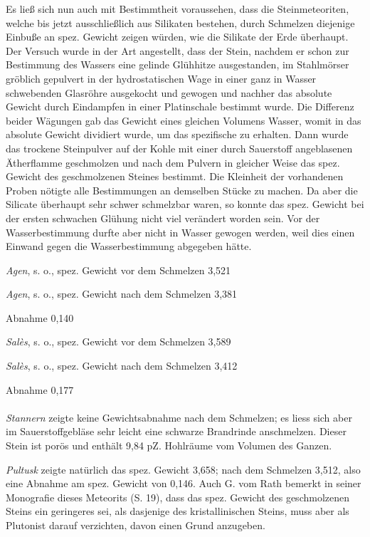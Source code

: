 \documentclass[a4paper, 11pt, oneside, german]{article}
\begin{document}
Es ließ sich nun auch mit Bestimmtheit voraussehen, dass die Steinmeteoriten, welche bis jetzt ausschließlich aus Silikaten bestehen, durch Schmelzen diejenige Einbuße an spez. Gewicht zeigen würden, wie die Silikate der Erde überhaupt. Der Versuch wurde in der Art angestellt, dass der Stein, nachdem er schon zur Bestimmung des Wassers eine gelinde Glühhitze ausgestanden, im Stahlmörser gröblich gepulvert in der hydrostatischen Wage in einer ganz in Wasser schwebenden Glasröhre ausgekocht und gewogen und nachher das absolute Gewicht durch Eindampfen in einer Platinschale bestimmt wurde. Die Differenz beider Wägungen gab das Gewicht eines gleichen Volumens Wasser, womit in das absolute Gewicht dividiert wurde, um das spezifische zu erhalten. Dann wurde das trockene Steinpulver auf der Kohle mit einer durch Sauerstoff angeblasenen Ätherflamme geschmolzen und nach dem Pulvern in gleicher Weise das spez. Gewicht des geschmolzenen Steines bestimmt. Die Kleinheit der vorhandenen Proben nötigte alle Bestimmungen an demselben Stücke zu machen. Da aber die Silicate überhaupt sehr schwer schmelzbar waren, so konnte das spez. Gewicht bei der ersten schwachen Glühung nicht viel verändert worden sein. Vor der Wasserbestimmung durfte aber nicht in Wasser gewogen werden, weil dies einen Einwand gegen die Wasserbestimmung abgegeben hätte.
\begin{center}
\emph{Agen}, s. o., spez. Gewicht vor dem Schmelzen 3,521

\emph{Agen}, s. o., spez. Gewicht nach dem Schmelzen 3,381

Abnahme 0,140
\end{center}
\begin{center}
\emph{Salès}, s. o., spez. Gewicht vor dem Schmelzen 3,589

\emph{Salès}, s. o., spez. Gewicht nach dem Schmelzen 3,412

Abnahme 0,177
\end{center}
\paragraph{}
\emph{Stannern} zeigte keine Gewichtsabnahme nach dem Schmelzen; es liess sich aber im Sauerstoffgebläse sehr leicht eine schwarze Brandrinde anschmelzen. Dieser Stein ist porös und enthält 9,84 pZ. Hohlräume vom Volumen des Ganzen.

\emph{Pultusk} zeigte natürlich das spez. Gewicht 3,658; nach dem Schmelzen 3,512, also eine Abnahme am spez. Gewicht von 0,146. Auch G. vom Rath bemerkt in seiner Monografie dieses Meteorits (S. 19), dass das spez. Gewicht des geschmolzenen Steins ein geringeres sei, als dasjenige des kristallinischen Steins, muss aber als Plutonist darauf verzichten, davon einen Grund anzugeben.
\end{document}
